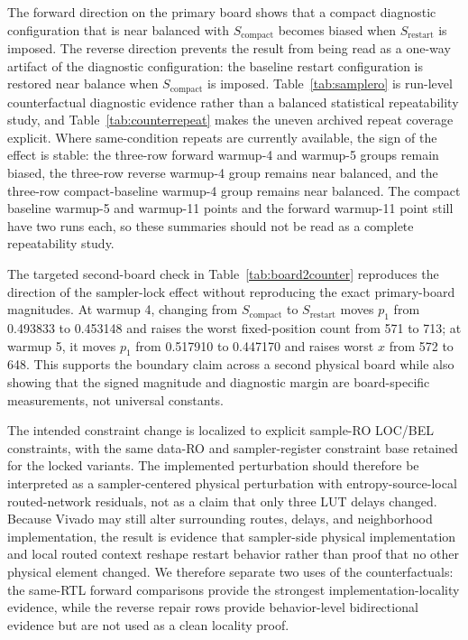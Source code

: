 \documentclass[journal]{IEEEtran}
\newcommand{\scompact}{$S_\mathrm{compact}$}
\newcommand{\srestart}{$S_\mathrm{restart}$}
\begin{document}
The forward direction on the primary board shows that a compact diagnostic configuration that is near balanced with \scompact{} becomes biased when \srestart{} is imposed. The reverse direction prevents the result from being read as a one-way artifact of the diagnostic configuration: the baseline restart configuration is restored near balance when \scompact{} is imposed. Table~\ref{tab:samplero} is run-level counterfactual diagnostic evidence rather than a balanced statistical repeatability study, and Table~\ref{tab:counterrepeat} makes the uneven archived repeat coverage explicit. Where same-condition repeats are currently available, the sign of the effect is stable: the three-row forward warmup-4 and warmup-5 groups remain biased, the three-row reverse warmup-4 group remains near balanced, and the three-row compact-baseline warmup-4 group remains near balanced. The compact baseline warmup-5 and warmup-11 points and the forward warmup-11 point still have two runs each, so these summaries should not be read as a complete repeatability study.

The targeted second-board check in Table~\ref{tab:board2counter} reproduces the direction of the sampler-lock effect without reproducing the exact primary-board magnitudes. At warmup 4, changing from \scompact{} to \srestart{} moves $p_1$ from 0.493833 to 0.453148 and raises the worst fixed-position count from 571 to 713; at warmup 5, it moves $p_1$ from 0.517910 to 0.447170 and raises worst $x$ from 572 to 648. This supports the boundary claim across a second physical board while also showing that the signed magnitude and diagnostic margin are board-specific measurements, not universal constants.

The intended constraint change is localized to explicit sample-RO LOC/BEL constraints, with the same data-RO and sampler-register constraint base retained for the locked variants. The implemented perturbation should therefore be interpreted as a sampler-centered physical perturbation with entropy-source-local routed-network residuals, not as a claim that only three LUT delays changed. Because Vivado may still alter surrounding routes, delays, and neighborhood implementation, the result is evidence that sampler-side physical implementation and local routed context reshape restart behavior rather than proof that no other physical element changed. We therefore separate two uses of the counterfactuals: the same-RTL forward comparisons provide the strongest implementation-locality evidence, while the reverse repair rows provide behavior-level bidirectional evidence but are not used as a clean locality proof.
\end{document}
